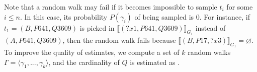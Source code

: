 \documentclass[25pt, a0paper, portrait]{tikzposter}
\begin{document}
{\noindent Note that a random walk may fail if it becomes impossible to sample $t_i$ for
some $i \leq n$. In this case, its probability $P(\gamma_i)$ of being sampled is 0.
For instance, if $t_1 = (B, P641, Q3609)$ is picked in
$\llbracket (?x1, P641, Q3609) \rrbracket_{G_1}$
instead of $(A, P641, Q3609)$, then the random walk fails because
$\llbracket (B, P17, ?x3) \rrbracket_{G_1} = \varnothing$.
%
To improve the quality of estimates, we compute a set of $k$ random
walks $\Gamma = \langle \gamma_1, ..., \gamma_k \rangle$, and the
cardinality of $Q$ is estimated as
.
  
}


\begin{columns} %
\end{columns}

\end{document}

